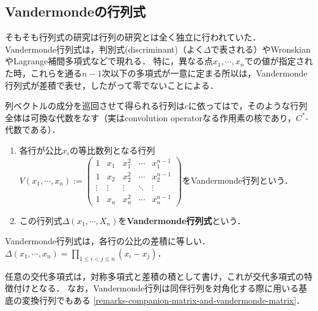 \documentclass[uplatex, dvipdfmx]{jsreport}
\begin{document}
\subsection{Vandermondeの行列式}

\begin{tcolorbox}[colframe=ForestGreen, colback=ForestGreen!10!white,breakable,colbacktitle=ForestGreen!40!white,coltitle=black,fonttitle=\bfseries\sffamily,
title=]
    そもそも行列式の研究は行列の研究とは全く独立に行われていた．
    Vandermonde行列式は，判別式(discriminant)（よく$\Delta$で表される）やWronskianやLagrange補間多項式などで現れる．
    特に，異なる点$x_1,\cdots,x_n$での値が指定された時，これらを通る$n-1$次以下の多項式が一意に定まる所以は，Vandermonde行列式が差積で表せ，したがって零でないことによる．
    
    列ベクトルの成分を巡回させて得られる行列は$c$に依ってはで，そのような行列全体は可換な代数をなす（実はconvolution operatorなる作用素の核であり，$C^*$-代数である）．
\end{tcolorbox}

\begin{definition}\mbox{}
    \begin{enumerate}
        \item 各行が公比$x_i$の等比数列となる行列$V(x_1,\cdots,x_n):=\begin{pmatrix}1&x_1&x_1^2&\cdots&x_1^{n-1}\\1&x_2&x_2^2&\cdots&x_2^{n-1}\\\vdots&\vdots&\vdots&\ddots&\vdots\\1&x_n&x_n^2&\cdots&x_n^{n-1}\end{pmatrix}$をVandermonde行列という．
        \item この行列式$\Delta(x_1,\cdots,X_n)$を\textbf{Vandermonde行列式}という．
    \end{enumerate}
\end{definition}

\begin{lemma}
    Vandermonde行列式は，各行の公比の差積に等しい．
    $\Delta(x_1,\cdots,x_n)=\prod_{1\le i<j\le n}(x_i-x_j)$．
\end{lemma}
\begin{remarks}[差積について]
    任意の交代多項式は，対称多項式と差積の積として書け，これが交代多項式の特徴付けとなる．
    なお，Vandermonde行列は同伴行列を対角化する際に用いる基底の変換行列でもある
    \ref{remarks-companion-matrix-and-vandermonde-matrix}．
\end{remarks}
\end{document}
